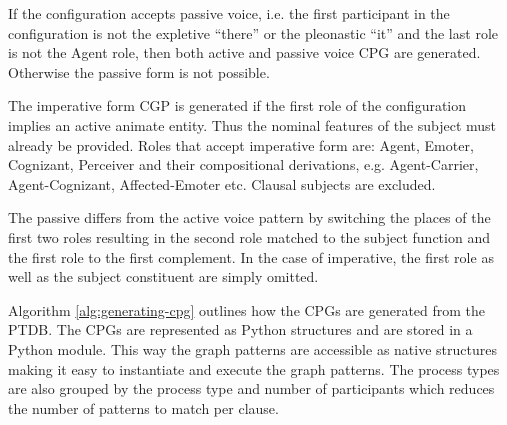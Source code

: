     
    If the configuration accepts passive voice, i.e. the first participant in the configuration is not the expletive ``there'' or the pleonastic ``it'' and the last role is not the Agent role, then both active and passive voice CPG are generated. Otherwise the passive form is not possible. 

    The imperative form CGP is generated if the first role of the configuration implies an active animate entity. Thus the nominal features of the subject must already be provided. Roles that accept imperative form are: Agent, Emoter, Cognizant, Perceiver and their compositional derivations, e.g. Agent-Carrier, Agent-Cognizant, Affected-Emoter etc. Clausal subjects are excluded. 

    The passive differs from the active voice pattern by switching the places of the first two roles resulting in the second role matched to the subject function and the first role to the first complement. In the case of imperative, the first role  as well as the subject constituent are simply omitted.  

    Algorithm \ref{alg:generating-cpg} outlines how the CPGs are generated from the PTDB. The CPGs are represented as Python structures and are stored in a Python module. This way the graph patterns are accessible as native structures making it easy to instantiate and execute the graph patterns. The process types are also grouped by the process type and number of participants which reduces the number of patterns to match per clause.  

